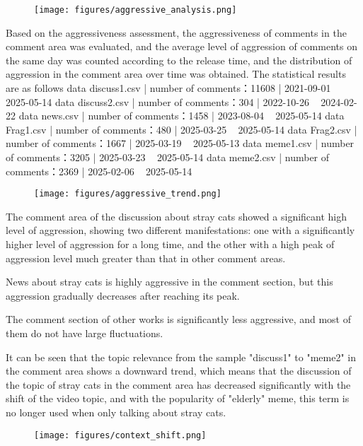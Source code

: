 \documentclass[12pt,a4paper]{ctexart}
\theoremstyle{MyLineTheoremStyle}
\theoremstyle{MyBlockTheoremStyle}
\theoremstyle{MySubsubsectionStyle}
\begin{document}
\begin{figure}[htbp]
    \centering
    \texttt{[image: figures/aggressive\_analysis.png]}
\end{figure}
\newpage

Based on the aggressiveness assessment, the aggressiveness of comments in the comment area was evaluated, and the average level of aggression of comments on the same day was counted according to the release time, and the distribution of aggression in the comment area over time was obtained.
The statistical results are as follows
data discuss1.csv | number of comments：11608 | 2021-09-01 ~ 2025-05-14
data discuss2.csv | number of comments：304 | 2022-10-26 ~ 2024-02-22
data news.csv | number of comments：1458 | 2023-08-04 ~ 2025-05-14
data Frag1.csv | number of comments：480 | 2025-03-25 ~ 2025-05-14
data Frag2.csv | number of comments：1667 | 2025-03-19 ~ 2025-05-13
data meme1.csv | number of comments：3205 | 2025-03-23 ~ 2025-05-14
data meme2.csv | number of comments：2369 | 2025-02-06 ~ 2025-05-14

\begin{figure}[htbp]
    \centering
    \texttt{[image: figures/aggressive\_trend.png]}
\end{figure}
\newpage

The comment area of the discussion about stray cats showed a significant high level of aggression, showing two different manifestations: one with a significantly higher level of aggression for a long time, and the other with a high peak of aggression level much greater than that in other comment areas.

News about stray cats is highly aggressive in the comment section, but this aggression gradually decreases after reaching its peak.

The comment section of other works is significantly less aggressive, and most of them do not have large fluctuations.

It can be seen that the topic relevance from the sample "discuss1" to "meme2" in the comment area shows a downward trend, which means that the discussion of the topic of stray cats in the comment area has decreased significantly with the shift of the video topic, and with the popularity of "elderly" meme, this term is no longer used when only talking about stray cats.

\begin{figure}[htbp]
    \centering
    \texttt{[image: figures/context\_shift.png]}
\end{figure}
\newpage
\end{document}
